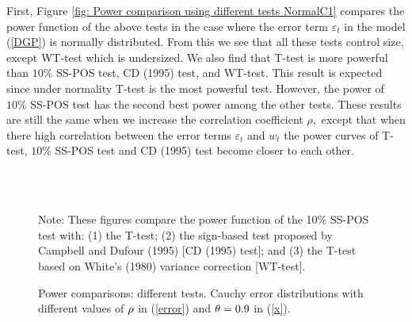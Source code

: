 \documentclass[harvard,11pt]{article}
\begin{document}
First, Figure \ref{fig: Power comparison using different tests NormalC1}
compares the power function of the above tests in the case where the error
term $\varepsilon _{t}$ in the model (\ref{DGP}) is normally distributed.
From this we see that all these tests control size, except WT-test which is
undersized. We also find that T-test is more powerful than $10\%$ SS-POS
test, CD (1995) test, and WT-test\textit{.} This result is expected since under
normality T-test is the most powerful test. However, the power of $10\%$
SS-POS test has the second best power among the other tests. These results
are still the same when we increase the correlation coefficient $\rho ,$
except that when there high correlation between the error terms $\varepsilon
_{t}$ and $w_{t}$ the power curves of T-test, $10\%$ SS-POS test and CD (1995)
test become closer to each other. 
\begin{figure}[tbph]
\caption{Power comparisons: different tests. Cauchy error distributions with
different values of $\protect\rho $ in (\protect\ref{error}) and $\protect%
\theta =0.9$ in (\protect\ref{x}).}
\begin{center}
 \\[0pt]
\\[0pt]
\end{center}

Note: These figures compare the power
function of the 10\% SS-POS test with: (1) the T-test; (2) the sign-based test
proposed by Campbell and Dufour (1995) [CD (1995) test]; and (3) the T-test based
on White's (1980) variance correction [WT-test]. 
\label{fig: Power comparaison using different tests CauchyC1}
\end{figure}
\end{document}

